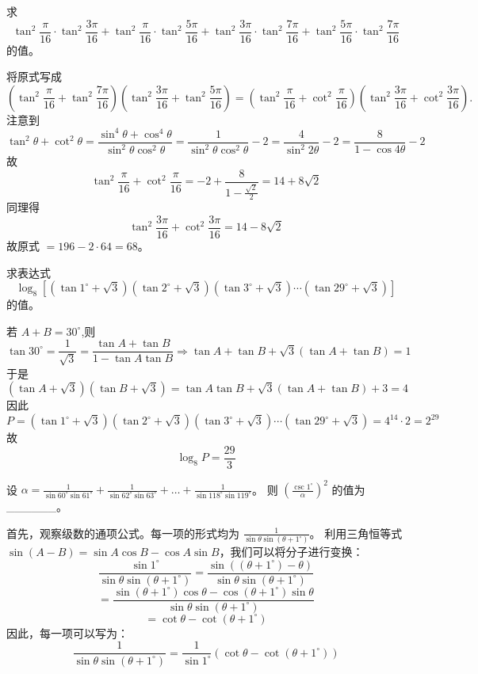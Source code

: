 \begin{questions}
    \question 求 
    \[
    \tan^2 \frac {\pi}{16} \cdot \tan^2 \frac {3\pi}{16} 
    +\tan^2 \frac {\pi}{16} \cdot \tan^2 \frac {5\pi}{16}
    +\tan^2 \frac {3\pi}{16} \cdot \tan^2 \frac {7\pi}{16}
    +\tan^2 \frac {5\pi}{16} \cdot \tan^2 \frac {7\pi}{16}\] 
    的值。
    \begin{solution}
        将原式写成
        \[
        \left(\tan^2 \frac{\pi}{16}+\tan^2\frac{7\pi}{16}\right)\left(\tan^2 \frac{3\pi}{16}+\tan^2 \frac{5\pi}{16}\right) = \left(\tan^2 \frac{\pi}{16}+\cot^2\frac{\pi}{16}\right)\left(\tan^2 \frac{3\pi}{16}+\cot^2 \frac{3\pi}{16}\right).
        \]
        注意到        
        \[
        \tan^2\theta+\cot^2\theta=\frac{\sin^4\theta+\cos^4\theta}{\sin^2\theta \cos^2\theta}
        =\frac{1}{\sin^2\theta \cos^2 \theta}-2
        = \frac{4}{\sin^2 2\theta} -2
        = \frac{8}{1-\cos 4\theta}-2
        \]
        故 
        \[
        \tan^2\dfrac{\pi}{16}+\cot^2\dfrac{\pi}{16} = -2+\dfrac{8}{1-\frac{\sqrt 2}{2}} = 14+8\sqrt 2
        \]
        同理得 
        \[
        \tan^2\dfrac{3\pi}{16}+\cot^2\dfrac{3\pi}{16}=14-8\sqrt 2
        \]
        故原式 $=196-2\cdot 64=68$。
    \end{solution}    

    \question 求表达式 
    \[
    \log_{8}[(\tan 1^\circ+\sqrt{3})(\tan 2^\circ+\sqrt{3})(\tan 3^\circ+\sqrt{3})\cdots(\tan 29^\circ+\sqrt{3})]
    \]
    的值。
    \begin{solution}
        若 $A + B = 30^\circ$,则
        \[
        \tan 30^\circ = \frac{1}{\sqrt{3}} = \frac{\tan A + \tan B}{1 - \tan A \tan B} \Rightarrow \tan A + \tan B + \sqrt{3}(\tan A + \tan B) = 1
        \]
        于是
        \[
        (\tan A + \sqrt{3})(\tan B + \sqrt{3}) = \tan A \tan B + \sqrt{3}(\tan A + \tan B) + 3 = 4
        \]
        因此
        \[
        P=(\tan 1^\circ+\sqrt{3})(\tan 2^\circ+\sqrt{3})(\tan 3^\circ+\sqrt{3})\cdots(\tan 29^\circ+\sqrt{3})=4^{14} \cdot 2 =2^{29}
        \]
        故
        \[
        \log_{8}P= \frac{29}{3}
        \]
    \end{solution}

    \question
设 $\alpha = \frac{1}{\sin 60^\circ \sin 61^\circ} + \frac{1}{\sin 62^\circ \sin 63^\circ} + \dots + \frac{1}{\sin 118^\circ \sin 119^\circ}$。
则 $\left( \frac{\csc 1^\circ}{\alpha} \right)^2$ 的值为 \_\_\_\_\_\_。

\begin{solution}
首先，观察级数的通项公式。每一项的形式均为 $\frac{1}{\sin \theta \sin(\theta + 1^\circ)}$。
利用三角恒等式 $\sin(A - B) = \sin A \cos B - \cos A \sin B$，我们可以将分子进行变换：
\[
\frac{\sin 1^\circ}{\sin \theta \sin(\theta + 1^\circ)} = \frac{\sin((\theta + 1^\circ) - \theta)}{\sin \theta \sin(\theta + 1^\circ)}
\]
\[
= \frac{\sin(\theta + 1^\circ) \cos \theta - \cos(\theta + 1^\circ) \sin \theta}{\sin \theta \sin(\theta + 1^\circ)}
\]
\[
= \cot \theta - \cot(\theta + 1^\circ)
\]
因此，每一项可以写为：
\[
\frac{1}{\sin \theta \sin(\theta + 1^\circ)} = \frac{1}{\sin 1^\circ} \left( \cot \theta - \cot(\theta + 1^\circ) \right)
\]


\end{solution}
\end{questions}
